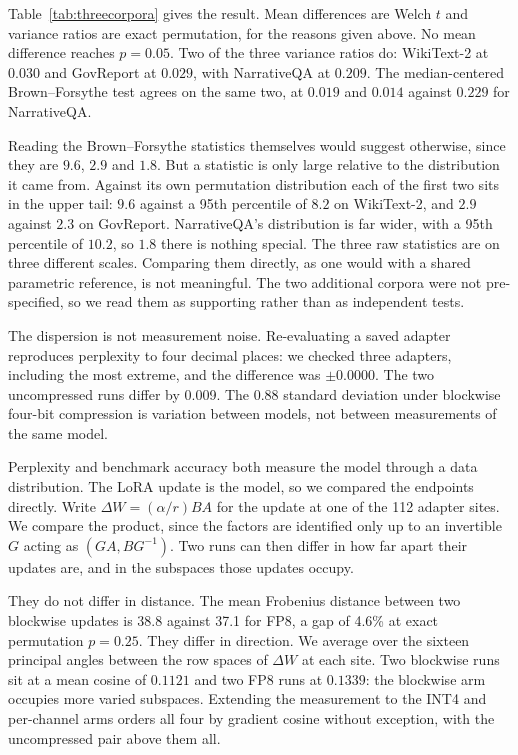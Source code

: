 \documentclass[11pt,letterpaper]{article}
\begin{document}
Table~\ref{tab:threecorpora} gives the result. Mean differences are Welch $t$ and variance ratios are exact permutation, for the reasons given above. No mean difference reaches $p = 0.05$. Two of the three variance ratios do: WikiText-2 at $0.030$ and GovReport at $0.029$, with NarrativeQA at $0.209$. The median-centered Brown--Forsythe test agrees on the same two, at $0.019$ and $0.014$ against $0.229$ for NarrativeQA.

Reading the Brown--Forsythe statistics themselves would suggest otherwise, since they are $9.6$, $2.9$ and $1.8$. But a statistic is only large relative to the distribution it came from. Against its own permutation distribution each of the first two sits in the upper tail: $9.6$ against a 95th percentile of $8.2$ on WikiText-2, and $2.9$ against $2.3$ on GovReport. NarrativeQA's distribution is far wider, with a 95th percentile of $10.2$, so $1.8$ there is nothing special. The three raw statistics are on three different scales. Comparing them directly, as one would with a shared parametric reference, is not meaningful. The two additional corpora were not pre-specified, so we read them as supporting rather than as independent tests.

The dispersion is not measurement noise. Re-evaluating a saved adapter reproduces perplexity to four decimal places: we checked three adapters, including the most extreme, and the difference was $\pm 0.0000$. The two uncompressed runs differ by 0.009. The 0.88 standard deviation under blockwise four-bit compression is variation between models, not between measurements of the same model.

\medskip
Perplexity and benchmark accuracy both measure the model through a data distribution. The LoRA update is the model, so we compared the endpoints directly. Write $\Delta W = (\alpha/r) BA$ for the update at one of the 112 adapter sites. We compare the product, since the factors are identified only up to an invertible $G$ acting as $(GA, BG^{-1})$. Two runs can then differ in how far apart their updates are, and in the subspaces those updates occupy.

They do not differ in distance. The mean Frobenius distance between two blockwise updates is 38.8 against 37.1 for FP8, a gap of 4.6\% at exact permutation $p = 0.25$. They differ in direction. We average over the sixteen principal angles between the row spaces of $\Delta W$ at each site. Two blockwise runs sit at a mean cosine of $0.1121$ and two FP8 runs at $0.1339$: the blockwise arm occupies more varied subspaces. Extending the measurement to the INT4 and per-channel arms orders all four by gradient cosine without exception, with the uncompressed pair above them all.
\end{document}
